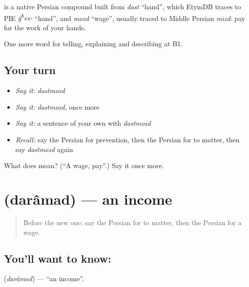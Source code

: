 \begin{cousinweb}
\textbf{} is a native Persian compound built from \emph{dast} \textquotedblleft{}hand\textquotedblright{}, which EtymDB traces to PIE \emph{ǵ\textsuperscript{h}es-} \textquotedblleft{}hand\textquotedblright{}, and \emph{mozd} \textquotedblleft{}wage\textquotedblright{}, usually traced to Middle Persian \emph{mizd}: pay for the work of your hands.
\end{cousinweb}

\begin{grammarlens}[title={What you've built}]
One more word for telling, explaining and describing at B1.
\end{grammarlens}

\subsection*{Your turn}
\begin{itemize}
\raggedright
  \item \emph{Say it:} \emph{dastmozd}
  \item \emph{Say it:} \emph{dastmozd}, once more
  \item \emph{Say it:} a sentence of your own with \emph{dastmozd}
  \item \emph{Recall:} say the Persian for prevention, then the Persian for to matter, then say \emph{dastmozd} again
\end{itemize}

\begin{tcolorbox}[breakable,colback=teal!4,colframe=teal!35!black,title={Before you move on}]
What does  mean? (\textquotedblleft{}A wage, pay\textquotedblright{}.) Say it once more.
\end{tcolorbox}
\section[\texorpdfstring{\fa{درآمد} (darâmad)}{درآمد (darâmad)}]{ (darâmad) — an income}

\label{lesson:FA-C378-daramad}



\begin{quote}
Before the new one: say the Persian for to matter, then the Persian for a wage.
\end{quote}

\subsection*{You'll want to know: }
\textbf{} (\emph{darâmad}) — \textquotedblleft{}an income\textquotedblright{}.

